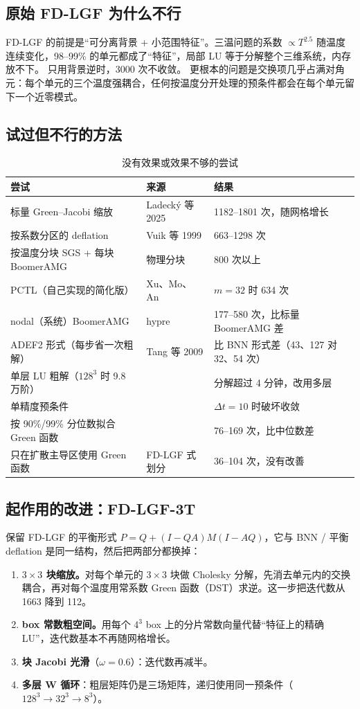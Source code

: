 \documentclass[11pt,a4paper]{ctexart}
\begin{document}
\subsection{原始 FD-LGF 为什么不行}
FD-LGF 的前提是“可分离背景 + 小范围特征”。三温问题的系数 $\propto T^{2.5}$ 随温度连续变化，98--99\% 的单元都成了“特征”，局部 LU 等于分解整个三维系统，内存放不下。
只用背景逆时，3000 次不收敛。
更根本的问题是交换项几乎占满对角元：每个单元的三个温度强耦合，任何按温度分开处理的预条件都会在每个单元留下一个近零模式。

\subsection{试过但不行的方法}
\begin{table}[H]\centering\small
\caption{没有效果或效果不够的尝试}
\begin{tabular}{p{6.0cm}p{3.2cm}p{6.0cm}}
\toprule
尝试 & 来源 & 结果 \\
\midrule
标量 Green--Jacobi 缩放 & Ladecký 等 2025 & 1182--1801 次，随网格增长 \\
按系数分区的 deflation & Vuik 等 1999 & 663--1298 次 \\
按温度分块 SGS + 每块 BoomerAMG & 物理分块 & 800 次以上 \\
PCTL（自己实现的简化版） & Xu、Mo、An & $m=32$ 时 634 次 \\
nodal（系统）BoomerAMG & hypre & 177--580 次，比标量 BoomerAMG 差 \\
ADEF2 形式（每步省一次粗解） & Tang 等 2009 & 比 BNN 形式差（43、127 对 32、54 次） \\
单层 LU 粗解（$128^3$ 时 9.8 万阶） & & 分解超过 4 分钟，改用多层 \\
单精度预条件 & & $\Delta t=10$ 时破坏收敛 \\
按 90\%/99\% 分位数拟合 Green 函数 & & 76--169 次，比中位数差 \\
只在扩散主导区使用 Green 函数 & FD-LGF 式划分 & 36--104 次，没有改善 \\
\bottomrule
\end{tabular}
\end{table}

\subsection{起作用的改进：FD-LGF-3T}
保留 FD-LGF 的平衡形式 $P=Q+(I-QA)M(I-AQ)$，它与 BNN / 平衡 deflation 是同一结构，然后把两部分都换掉：
\begin{enumerate}
\item \textbf{$3\times3$ 块缩放。}对每个单元的 $3\times3$ 块做 Cholesky 分解，先消去单元内的交换耦合，再对每个温度用常系数 Green 函数（DST）求逆。这一步把迭代数从 1663 降到 112。
\item \textbf{box 常数粗空间。}用每个 $4^3$ box 上的分片常数向量代替“特征上的精确 LU”，迭代数基本不再随网格增长。
\item \textbf{块 Jacobi 光滑}（$\omega=0.6$）：迭代数再减半。
\item \textbf{多层 W 循环}：粗层矩阵仍是三场矩阵，递归使用同一预条件（$128^3\to32^3\to8^3$）。
\end{enumerate}
\end{document}
